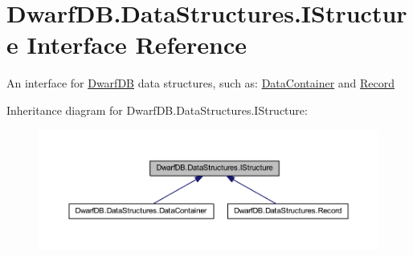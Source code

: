 \hypertarget{interface_dwarf_d_b_1_1_data_structures_1_1_i_structure}{\section{Dwarf\+D\+B.\+Data\+Structures.\+I\+Structure Interface Reference}
\label{interface_dwarf_d_b_1_1_data_structures_1_1_i_structure}
}


An interface for \hyperlink{namespace_dwarf_d_b}{Dwarf\+D\+B} data structures, such as\+: \hyperlink{class_dwarf_d_b_1_1_data_structures_1_1_data_container}{Data\+Container} and \hyperlink{class_dwarf_d_b_1_1_data_structures_1_1_record}{Record}  




Inheritance diagram for Dwarf\+D\+B.\+Data\+Structures.\+I\+Structure\+:
\nopagebreak
\begin{figure}[H]
\begin{center}
\leavevmode
\includegraphics[width=350pt]{interface_dwarf_d_b_1_1_data_structures_1_1_i_structure__inherit__graph}
\end{center}
\end{figure}
